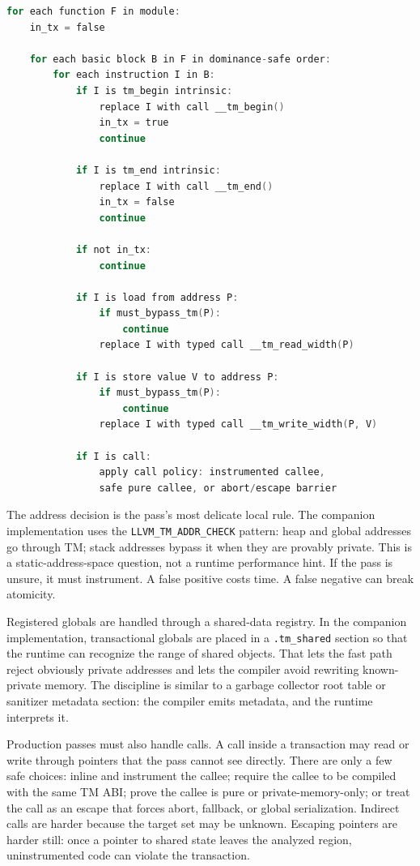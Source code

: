 \begin{lstlisting}[language=C, caption={Pseudocode for a conservative TM instrumentation pass.}]
for each function F in module:
    in_tx = false

    for each basic block B in F in dominance-safe order:
        for each instruction I in B:
            if I is tm_begin intrinsic:
                replace I with call __tm_begin()
                in_tx = true
                continue

            if I is tm_end intrinsic:
                replace I with call __tm_end()
                in_tx = false
                continue

            if not in_tx:
                continue

            if I is load from address P:
                if must_bypass_tm(P):
                    continue
                replace I with typed call __tm_read_width(P)

            if I is store value V to address P:
                if must_bypass_tm(P):
                    continue
                replace I with typed call __tm_write_width(P, V)

            if I is call:
                apply call policy: instrumented callee,
                safe pure callee, or abort/escape barrier
\end{lstlisting}

The address decision is the pass's most delicate local rule. The companion implementation uses the \texttt{LLVM\_TM\_ADDR\_CHECK} pattern: heap and global addresses go through TM; stack addresses bypass it when they are provably private. This is a static-address-space question, not a runtime performance hint. If the pass is unsure, it must instrument. A false positive costs time. A false negative can break atomicity.

Registered globals are handled through a shared-data registry. In the companion implementation, transactional globals are placed in a \texttt{.tm\_shared} section so that the runtime can recognize the range of shared objects. That lets the fast path reject obviously private addresses and lets the compiler avoid rewriting known-private memory. The discipline is similar to a garbage collector root table or sanitizer metadata section: the compiler emits metadata, and the runtime interprets it.

Production passes must also handle calls. A call inside a transaction may read or write through pointers that the pass cannot see directly. There are only a few safe choices: inline and instrument the callee; require the callee to be compiled with the same TM ABI; prove the callee is pure or private-memory-only; or treat the call as an escape that forces abort, fallback, or global serialization. Indirect calls are harder because the target set may be unknown. Escaping pointers are harder still: once a pointer to shared state leaves the analyzed region, uninstrumented code can violate the transaction.


